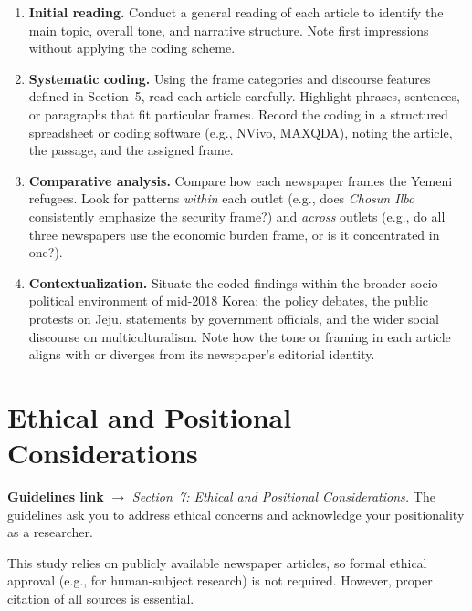 \documentclass[11pt,a4paper]{article}
\begin{document}
\medskip

\begin{enumerate}[leftmargin=1.8em]
  \item \textbf{Initial reading.} Conduct a general reading of each article to identify the main topic, overall tone, and narrative structure. Note first impressions without applying the coding scheme.

  \item \textbf{Systematic coding.} Using the frame categories and discourse features defined in Section~5, read each article carefully. Highlight phrases, sentences, or paragraphs that fit particular frames. Record the coding in a structured spreadsheet or coding software (e.g., NVivo, MAXQDA), noting the article, the passage, and the assigned frame.

  \item \textbf{Comparative analysis.} Compare how each newspaper frames the Yemeni refugees. Look for patterns \textit{within} each outlet (e.g., does \textit{Chosun Ilbo} consistently emphasize the security frame?) and \textit{across} outlets (e.g., do all three newspapers use the economic burden frame, or is it concentrated in one?).

  \item \textbf{Contextualization.} Situate the coded findings within the broader socio-political environment of mid-2018 Korea: the policy debates, the public protests on Jeju, statements by government officials, and the wider social discourse on multiculturalism. Note how the tone or framing in each article aligns with or diverges from its newspaper's editorial identity.
\end{enumerate}


\section{Ethical and Positional Considerations}

\begin{crossrefbox}
\textbf{Guidelines link} $\rightarrow$ \textit{Section~7: Ethical and Positional Considerations.} The guidelines ask you to address ethical concerns and acknowledge your positionality as a researcher.
\end{crossrefbox}

\medskip

This study relies on publicly available newspaper articles, so formal ethical approval (e.g., for human-subject research) is not required. However, proper citation of all sources is essential.
\end{document}
